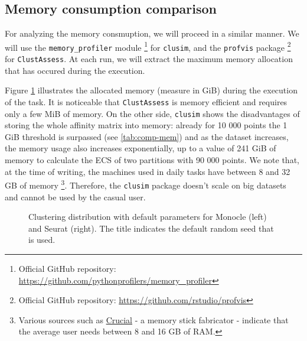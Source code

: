 \subsection{Memory consumption comparison}
For analyzing the memory consmuption, we will proceed in a similar manner. We will use the \verb|memory_profiler| module \footnote{Official GitHub repository: \url{https://github.com/pythonprofilers/memory_profiler}} for \verb|clusim|, and the \verb|profvis| package \footnote{Official GitHub repository: \url{https://github.com/rstudio/profvis}} for \verb|ClustAssess|. At each run, we will extract the maximum memory allocation that has occured during the execution.

Figure \ref{fig:comp-mem} illustrates the allocated memory (measure in GiB) during the execution of the task. It is noticeable that \verb|ClustAssess| is memory efficient and requires only a few MiB of memory. On the other side, \verb|clusim| shows the disadvantages of storing the whole affinity matrix into memory: already for 10 000 points the 1 GiB threshold is surpassed (see \ref{tab:comp-mem}) and as the dataset increases, the memory usage also increases exponentially, up to a value of 241 GiB of memory to calculate the ECS of two partitions with 90 000 points.
We note that, at the time of writing, the machines used in daily tasks have between 8 and 32 GB of memory \footnote{Various sources such as \href{https://www.crucial.com/articles/about-memory/how-much-ram-does-my-computer-need}{Crucial} - a memory stick fabricator - indicate that the average user needs between 8 and 16 GB of RAM.}. Therefore, the \verb|clusim| package doesn't scale on big datasets and cannot be used by the casual user.

\begin{figure}[H]
    \centering
    \caption{\label{fig:comp-mem}Clustering distribution with default parameters for Monocle (left) and Seurat (right). The title indicates the default random seed that is used.}
\end{figure}


